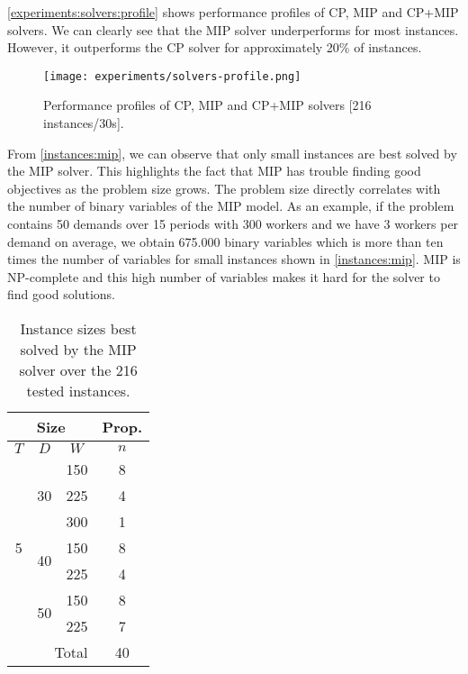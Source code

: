 \documentclass[../../thesis.tex]{subfiles}
\begin{document}
\autoref{experiments:solvers:profile} 
shows performance profiles of CP, MIP and CP+MIP solvers. We can clearly see that 
the MIP solver underperforms for most instances. However, it outperforms the CP solver for approximately
20\% of instances. 

\begin{figure}
  \centering
  \texttt{[image: experiments/solvers-profile.png]}
  \caption{Performance profiles of CP, MIP and CP+MIP solvers [216 instances/30s].}
  \label{experiments:solvers:profile}
\end{figure}

From \autoref{instances:mip}, we can observe that only small instances are best solved by the MIP solver. 
This highlights the fact that MIP has trouble finding good objectives as the problem size grows.
The problem size directly correlates with the number of binary variables of the MIP model. As an example,
if the problem contains 50 demands over 15 periods with 300 workers and we have 3 workers per demand on average,
we obtain 675.000 binary variables which is more than ten times the number of variables for small instances shown 
in \autoref{instances:mip}. MIP is NP-complete and this high number of variables makes it hard for the solver to find good solutions.


\begin{table}[H]
  \caption{Instance sizes best solved by the MIP solver over the 216 tested instances.}
  \label{instances:mip}
  \centering
  \begin{tabular}[t]{|c|c|c |c|}
    \hline
    \multicolumn{3}{|c|}{Size} & \multicolumn{1}{|c|}{Prop.} \\
    \hline 
    $T$ & $D$ & $W$ & $n$  \\
    \hline 
    \multirow{7}{*}{5} & \multirow{3}{*}{30} & 150 & 8  \\ 
    \cline{3-4}
     &  & 225 & 4  \\ 
     \cline{3-4}
     &  & 300 & 1  \\ 
     \cline{2-4}
     & \multirow{2}{*}{40} & 150 & 8  \\ 
     \cline{3-4}
     &  & 225 & 4  \\ 
     \cline{3-4}
     \cline{2-4}
     & \multirow{2}{*}{50} & 150 & 8  \\ 
     \cline{3-4}
     &  & 225 & 7  \\ 
     \hline
     \multicolumn{3}{|r|}{Total} & 40 \\
      \hline
  \end{tabular}
\end{table}
\end{document}
